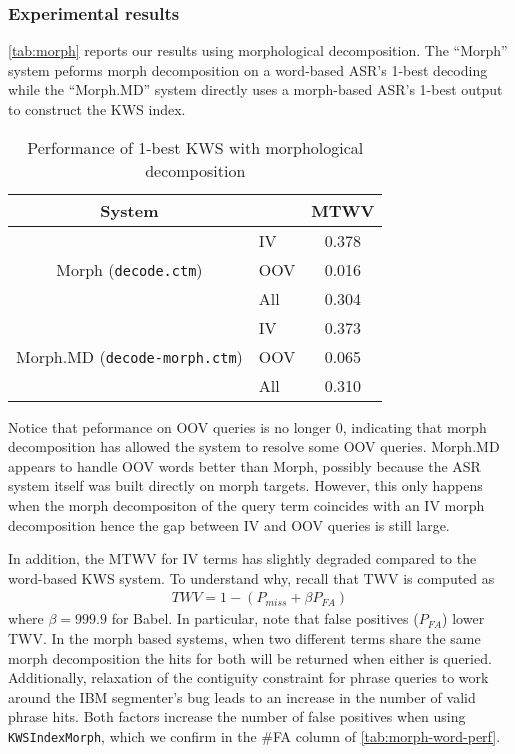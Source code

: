 \documentclass[a4paper,oneside,reqno]{amsart}
\begin{document}
\subsubsection{Experimental results}

\autoref{tab:morph} reports our results using morphological decomposition.
The ``Morph'' system peforms morph decomposition on a word-based ASR's 1-best
decoding while the ``Morph.MD'' system directly uses a morph-based ASR's 1-best
output to construct the KWS index.

\begin{table}[ht!]
  \begin{tabular}{clc}
    \toprule
    System & & MTWV \\
    \midrule
    \multirow{3}{*}{Morph (\texttt{decode.ctm})}
      & IV & 0.378 \\
      & OOV & 0.016 \\
      & All & 0.304 \\
    \multirow{3}{*}{Morph.MD (\texttt{decode-morph.ctm})}
      & IV & 0.373 \\
      & OOV & 0.065 \\
      & All & 0.310 \\
    \bottomrule
  \end{tabular}
  \caption{Performance of 1-best KWS with morphological decomposition}
  \label{tab:morph}
\end{table}

Notice that peformance on OOV queries is no longer $0$, indicating that
morph decomposition has allowed the system to resolve some OOV queries.
Morph.MD appears to handle OOV words better than Morph, possibly because
the ASR system itself was built directly on morph targets. However, this
only happens when the morph decompositon of the query term coincides
with an IV morph decomposition hence the gap between IV and OOV queries
is still large.

In addition, the MTWV for IV terms has slightly degraded compared to the
word-based KWS system. To understand why, recall that TWV is computed as
\begin{align}
  \label{eq:twv}
  TWV = 1 - (P_{miss} + \beta P_{FA})
\end{align}
where $\beta = 999.9$ for Babel. In particular, note that false positives
($P_{FA}$) lower TWV. In the morph based systems, when two different terms
share the same morph decomposition the hits for both will be returned when
either is queried.  Additionally, relaxation of the contiguity constraint for
phrase queries to work around the IBM segmenter's bug leads to an increase in
the number of valid phrase hits. Both factors increase the number of false
positives when using \texttt{KWSIndexMorph}, which we confirm in the \#FA
column of \autoref{tab:morph-word-perf}.
\end{document}
